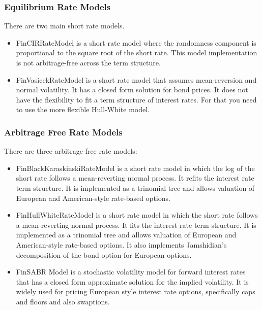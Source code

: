 \documentclass[twoside,11pt]{book}
\begin{document}
\subsubsection*{Equilibrium Rate Models}
There are two main short rate models.
\begin{itemize}
\item{ FinCIRRateModel is a short rate model where the randomness component is proportional to the square root of the short rate. This model implementation is not arbitrage-free across the term structure.
}
\item{ FinVasicekRateModel is a short rate model that assumes mean-reversion and normal volatility. It has a closed form solution for bond prices. It does not have the flexibility to fit a term structure of interest rates. For that you need to use the more flexible Hull-White model.
}
\end{itemize}

\subsubsection*{Arbitrage Free Rate Models}
There are three arbitrage-free rate models:
\begin{itemize}
\item{ FinBlackKaraskinskiRateModel is a short rate model in which the log of the short rate follows a mean-reverting normal process. It refits the interest rate term structure. It is implemented as a trinomial tree and allows valuation of European and American-style rate-based options.
}
\item{ FinHullWhiteRateModel is a short rate model in which the short rate follows a mean-reverting normal process. It fits the interest rate term structure. It is implemented as a trinomial tree and allows valuation of European and American-style rate-based options. It also implements Jamshidian's decomposition of the bond option for European options.
}
\item{ FinSABR Model is a stochastic volatility model for forward interest rates that has a closed form approximate solution for the implied volatility. It is widely used for pricing European style interest rate options, specifically caps and floors and also swaptions.
}
\end{itemize}
\end{document}
